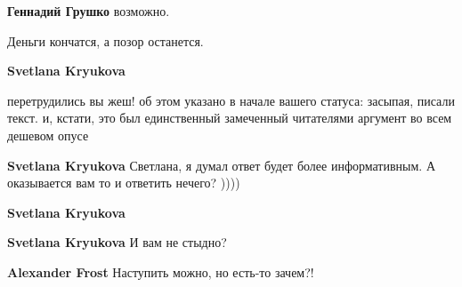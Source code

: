 \begin{itemize}
\begin{itemize}
\textbf{Геннадий Грушко} возможно.

 
Деньги кончатся, а позор останется.

 
\textbf{Svetlana Kryukova} 

перетрудились вы жеш! об этом указано в начале вашего статуса: засыпая, писали
текст. и, кстати, это был единственный замеченный читателями аргумент во всем
дешевом опусе


 
\textbf{Svetlana Kryukova} Светлана, я думал ответ будет более информативным. А оказывается вам то и ответить нечего? ))))

 
\textbf{Svetlana Kryukova} 🤮

 
\textbf{Svetlana Kryukova}
И вам не стыдно?

 
\textbf{Alexander Frost} Наступить можно, но есть-то зачем?!

 

\end{itemize}
\end{itemize}
